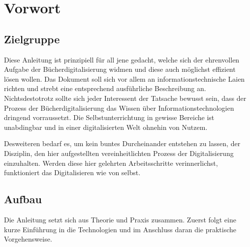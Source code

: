 
\section{Vorwort}

\subsection{Zielgruppe}

Diese Anleitung ist prinzipiell für all jene gedacht, welche sich
der ehrenvollen Aufgabe der Bücherdigitalisierung widmen und diese
auch möglichst effizient lösen wollen. Das Dokument soll sich vor
allem an informationstechnische Laien richten und strebt eine entsprechend
ausführliche Beschreibung an. Nichtsdestotrotz sollte sich jeder Interessent
der Tatsache bewusst sein, dass der Prozess der Bücherdigitalisierung
das Wissen über Informationstechnologien dringend vorraussetzt. Die
Selbstunterrichtung in gewisse Bereiche ist unabdingbar und in einer
digitalisierten Welt ohnehin von Nutzem.

Desweiteren bedarf es, um kein buntes Durcheinander entstehen zu lassen,
der Disziplin, den hier aufgestellten vereinheitlichten Prozess der
Digitalisierung einzuhalten. Werden diese hier gelehrten Arbeitsschritte
verinnerlichst, funktioniert das Digitalisieren wie von selbst.

\subsection{Aufbau}

Die Anleitung setzt sich aus Theorie und Praxis zusammen. Zuerst folgt
eine kurze Einführung in die Technologien und im Anschluss daran die
praktische Vorgehensweise.
